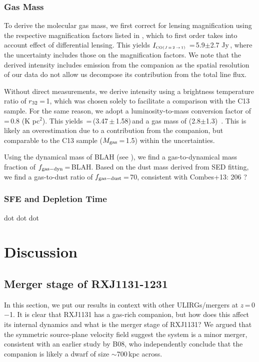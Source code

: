 \documentclass[]{emulateapj}
\begin{document}
\subsubsection{Gas Mass}
To derive the molecular gas mass, we first correct for lensing magnification
using the respective magnification factors listed in , which to
first order takes into account effect of differential lensing. This yields
$I_{\tiny \mbox{CO($J$\,=\,2\,$\rightarrow$\,1) }}$\,=\,5.9$\pm$2.7 Jy\,\kms, where the uncertainty includes those on
the magnification factors.
We note that the derived intensity includes emission from the companion
as the spatial resolution of our data do not allow us decompose its contribution
from the total line flux.

Without direct  measurements,
we derive  intensity
using a brightness temperature ratio of $r_{\rm 32}$\,=\,1, which was chosen
solely to facilitate a comparison with the C13 sample. For the same reason, we
adopt a luminosity-to-mass conversion factor of
\alphaco\,=\,0.8 (K \kms pc$^2$)\pmOne. This yields
\Lp\,=\,(3.47\,$\pm$\,1.58)\,\Lsun and a gas mass
of (2.8$\pm$1.3)\, \Msun. This is likely
an overestimation due to a contribution from the companion, but 
comparable to the C13 sample ($M_{\rm gas}$\,=\,1.5\Msun) within the
uncertainties.

Using the dynamical mass of BLAH (see ), we find
a gas-to-dynamical mass fraction of $f_{\rm gas-dyn}$\,=\,BLAH.
Based on the dust mass derived from SED fitting, we find a gas-to-dust ratio of
$f_{\rm gas-dust}$\,=\,70, consistent with Combes+13: 206 ?

\subsubsection{SFE and Depletion Time}
dot dot dot


\section{Discussion}
\subsection{Merger stage of RXJ1131-1231}
In this section, we put our results in context with other ULIRGs/mergers at
$z$\,=\,0$-$1. It is clear that RXJ1131 has a gas-rich companion, but how does
this affect its internal dynamics and what is the merger stage of RXJ1131?
We argued that the symmetric source-plane velocity field suggest
the system is a minor merger, consistent with an earlier study by B08, who
independently conclude that the companion is likely
a dwarf of size $\sim$700\,kpc across.
\end{document}
